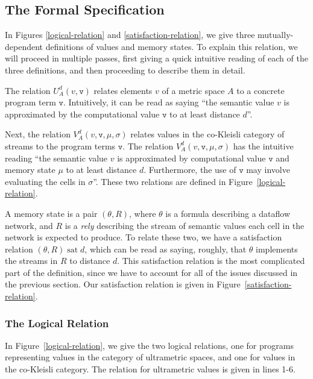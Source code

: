 \documentclass[preprint]{sigplanconf}
\newcommand{\term}[1]{\ensuremath{\mathtt{{#1}}}}
\newcommand{\satisfy}[2]{{#1}\;\mathrm{sat}\;{#2}}
\begin{document}
\subsection{The Formal Specification}

In Figures \ref{logical-relation} and \ref{satisfaction-relation}, we
give three mutually-dependent definitions of values and memory
states. To explain this relation, we will proceed in multiple passes,
first giving a quick intuitive reading of each of the three
definitions, and then proceeding to describe them in detail.

The relation $U^d_A(v, \term{v})$ relates elements $v$ of a metric
space $A$ to a concrete program term \term{v}. Intuitively, it can be
read as saying ``the semantic value $v$ is approximated by the
computational value \term{v} to at least distance $d$''. 

Next, the relation $V^d_A(v, \term{v}, \mu, \sigma)$ relates values in
the co-Kleisli category of streams to the program terms \term{v}. The
relation $V^d_A(v, \term{v}, \mu, \sigma)$ has the intuitive reading
``the semantic value $v$ is approximated by computational value
\term{v} and memory state $\mu$ to at least distance $d$. Furthermore,
the use of \term{v} may involve evaluating the cells in
$\sigma$''. These two relations are defined in
Figure~\ref{logical-relation}.

A memory state is a pair $(\theta, R)$, where $\theta$ is a formula
describing a dataflow network, and $R$ is a \emph{rely} describing the
stream of semantic values each cell in the network is expected to
produce. To relate these two, we have a satisfaction relation
$\satisfy{(\theta, R)}{d}$, which can be read as saying, roughly, that
$\theta$ implements the streams in $R$ to distance $d$. This
satisfaction relation is the most complicated part of the definition,
since we have to account for all of the issues discussed in the
previous section. Our satisfaction relation is given in
Figure~\ref{satisfaction-relation}.

\subsubsection{The Logical Relation}

In Figure~\ref{logical-relation}, we give the two logical relations,
one for programs representing values in the category of ultrametric
spaces, and one for values in the co-Kleisli category. The relation
for ultrametric values is given in lines 1-6. 
\end{document}
